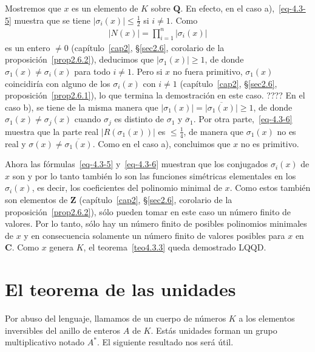 \documentclass[bibtotoc,leqno,spanish]{amsbook}
\let\emph\relax %
\newcommand{\QQ}{\mathbf{Q}}
\newcommand{\ZZ}{\mathbf{Z}}
\newcommand{\CC}{\mathbf{C}}
\newcommand{\QED}{LQQD.}
\newcommand{\oline}[1]{\overline{#1}}
\newcommand{\abs}[1]{\left\lvert#1\right\rvert}
\numberwithin{equation}{section}
\theoremstyle{note}
\theoremstyle{note}
\theoremstyle{rem}
\numberwithin{theorem}{section}
\numberwithin{proposition}{section}
\numberwithin{definition}{section}
\numberwithin{lemma}{section}
\numberwithin{corollary}{section}
\numberwithin{example}{section}
\numberwithin{footnote}{section}%
\begin{document}
Mostremos que $x$ es un elemento \emph{primitivo} de $K$ sobre $\QQ$. En efecto, en el caso a),~\eqref{eq-4.3-5}
muestra que se tiene $\abs{\sigma_{i}(x)}\leq\frac{1}{2}$ si $i\neq 1$. Como
\begin{gather*}
\abs{N(x)} = \prod_{i=1}^{n}\abs{\sigma_{i}(x)}
\end{gather*}
es un entero $\neq 0$ (cap\'itulo~\ref{cap2}, \S\ref{sec2.6}, corolario de la proposici\'on~\ref{prop2.6.2}),
deducimos que $\abs{\sigma_{1}(x)}\geq 1$,
de donde $\sigma_{1}(x)\neq\sigma_{i}(x)$ para todo $i\neq 1$. Pero si $x$ no fuera primitivo,
$\sigma_{1}(x)$ coincidir\'ia con alguno de los $\sigma_{i}(x)$ con $i\neq 1$
(cap\'itulo~\ref{cap2}, \S\ref{sec2.6}, proposici\'on~\ref{prop2.6.1}),
lo que termina la demostraci\'on en este caso. ???? En el caso b), se tiene de la misma manera que
$\abs{\sigma_{1}(x)}=\oline{\abs{\sigma_{1}(x)}}\geq 1$, de donde $\sigma_{1}(x)\neq\sigma_{j}(x)$
cuando $\sigma_{j}$ es distinto de $\sigma_{1}$ y $\oline\sigma_{1}$. Por otra parte,~\eqref{eq-4.3-6}
muestra que la parte real $\abs{R(\sigma_{1}(x))}$ es $\leq\frac{1}{4}$, de manera que $\sigma_{1}(x)$
no es real y $\sigma(x)\neq\oline{\sigma_{1}(x)}$. Como en el caso a), concluimos que $x$ no es primitivo.

Ahora las f\'ormulas~\eqref{eq-4.3-5} y~\eqref{eq-4.3-6} muestran que los conjugados $\sigma_{i}(x)$ de $x$ son
\emph{acotados,} y por lo tanto tambi\'en lo son las funciones sim\'etricas elementales en los $\sigma_{i}(x)$,
es decir, los coeficientes del polinomio minimal de $x$. Como estos tambi\'en son elementos de $\ZZ$
(cap\'itulo~\ref{cap2}, \S\ref{sec2.6}, corolario de la proposici\'on~\ref{prop2.6.2}),
s\'olo pueden tomar en este caso un n\'umero finito de valores.
Por lo tanto, s\'olo hay un n\'umero finito de posibles polinomios minimales de $x$ y en consecuencia
solamente un n\'umero finito de valores posibles para $x$ en $\CC$. Como $x$ genera $K$, el teorema~\ref{teo4.3.3} queda
demostrado LQQD.%

\section{El teorema de las unidades}\label{sec4.4}

Por abuso del lenguaje, llamamos \emph{unidades} de un cuerpo de n\'umeros $K$ a los elementos inversibles
del anillo de enteros $A$ de $K$. Est\'as unidades forman un grupo multiplicativo notado $A^{*}$. El
siguiente resultado nos ser\'a \'util.
\end{document}
